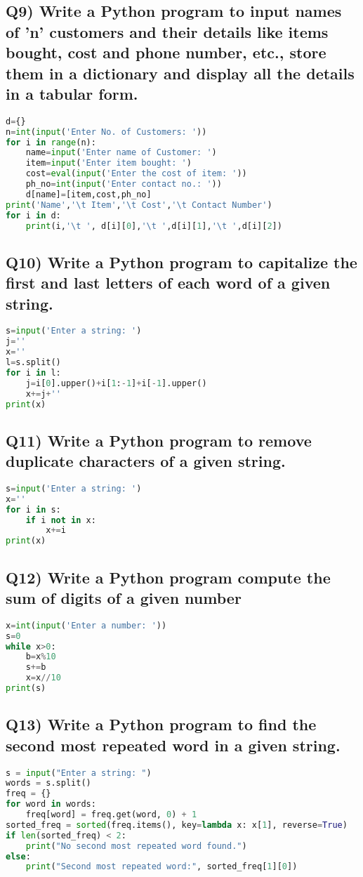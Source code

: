 \documentclass{article}
\begin{document}
\subsection*{Q9) Write a Python program to input names of 'n' customers and their details like items bought, cost and phone number, etc., store them in a dictionary and display all the details in a tabular form.}
\begin{lstlisting}[language=Python]
d={}
n=int(input('Enter No. of Customers: '))
for i in range(n):
    name=input('Enter name of Customer: ')
    item=input('Enter item bought: ')
    cost=eval(input('Enter the cost of item: '))
    ph_no=int(input('Enter contact no.: '))
    d[name]=[item,cost,ph_no]
print('Name','\t Item','\t Cost','\t Contact Number')
for i in d:
    print(i,'\t ', d[i][0],'\t ',d[i][1],'\t ',d[i][2])
\end{lstlisting}

\subsection*{Q10) Write a Python program to capitalize the first and last letters of each word of a given string.}
\begin{lstlisting}[language=Python]
s=input('Enter a string: ')
j=''
x=''
l=s.split()
for i in l:
    j=i[0].upper()+i[1:-1]+i[-1].upper()
    x+=j+''
print(x)
\end{lstlisting}

\subsection*{Q11) Write a Python program to remove duplicate characters of a given string.}
\begin{lstlisting}[language=Python]
s=input('Enter a string: ')
x=''
for i in s:
    if i not in x:
        x+=i
print(x)
\end{lstlisting}

\subsection*{Q12) Write a Python program compute the sum of digits of a given number}
\begin{lstlisting}[language=Python]
x=int(input('Enter a number: '))
s=0
while x>0:
    b=x%10
    s+=b
    x=x//10
print(s)
\end{lstlisting}

\subsection*{Q13) Write a Python program to find the second most repeated word in a given string.}
\begin{lstlisting}[language=Python]
s = input("Enter a string: ")
words = s.split()
freq = {}
for word in words:
    freq[word] = freq.get(word, 0) + 1
sorted_freq = sorted(freq.items(), key=lambda x: x[1], reverse=True)
if len(sorted_freq) < 2:
    print("No second most repeated word found.")
else:
    print("Second most repeated word:", sorted_freq[1][0])
\end{lstlisting}
\end{document}

